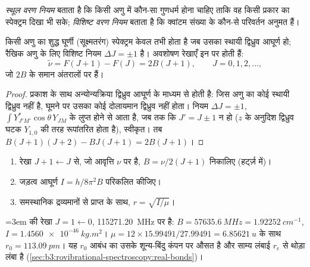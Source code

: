\begin{definition}[स्थूल और विशिष्ट वरण नियम]\label{def:b3:rovibrational-spectroscopy:selection}
\emph{स्थूल वरण नियम} बताता है कि किसी अणु में
कौन-सा गुणधर्म होना चाहिए ताकि वह किसी प्रकार का स्पेक्ट्रम दिखा भी सके;
\emph{विशिष्ट वरण नियम} बताता है कि क्वांटम संख्या के
कौन-से परिवर्तन अनुमत हैं।
\end{definition}

\begin{proposition}[शुद्ध घूर्णी स्पेक्ट्रम]\label{prop:b3:rovibrational-spectroscopy:rotational-lines}
किसी अणु का शुद्ध घूर्णी (सूक्ष्मतरंग) स्पेक्ट्रम केवल तभी होता है जब उसका
स्थायी द्विध्रुव आघूर्ण हो; रैखिक अणु के लिए विशिष्ट नियम $\Delta J
= \pm1$ है। अवशोषण रेखाएँ इन पर होती हैं:
\[
\tilde\nu = F(J+1) - F(J) = 2B(J + 1), \qquad J = 0, 1, 2, \dots,
\]
जो $2B$ के समान अंतरालों पर हैं।
\end{proposition}

\begin{proof}
प्रकाश के साथ अन्योन्यक्रिया द्विध्रुव आघूर्ण के माध्यम से होती है: जिस अणु का कोई
स्थायी द्विध्रुव नहीं है, घूमने पर उसका कोई दोलायमान द्विध्रुव नहीं होता। नियम $\Delta J
= \pm1$, $\int Y_{J'M'}^*\cos\theta\,Y_{JM}$ के लुप्त होने से आता है, जब तक कि $J' = J
\pm 1$ न हो ($z$ के अनुदिश द्विध्रुव घटक $Y_{1,0}$ की तरह रूपांतरित होता है), स्वीकृत।
तब $B(J+1)(J+2) - BJ(J+1) = 2B(J+1)$।
\end{proof}

\begin{method}[घूर्णी रेखा से आबंध लंबाई]\label{met:b3:rovibrational-spectroscopy:bond-length}
\begin{enumerate}
  \item रेखा $J + 1 \leftarrow J$ से, जो आवृत्ति $\nu$ पर है, $B =
        \nu/2(J+1)$ निकालिए (हर्ट्ज़ में)।
  \item जड़त्व आघूर्ण $I = h/8\pi^2B$ परिकलित कीजिए।
  \item समस्थानिक द्रव्यमानों से प्राप्त  के साथ, $r = \sqrt{I/\mu}$।
\end{enumerate}
\end{method}

\begin{example}[कार्बन मोनोऑक्साइड]\label{ex:b3:rovibrational-spectroscopy:co}\emergencystretch=3em
 की रेखा $J = 1 \leftarrow 0$, \qty{115271.20}{MHz} पर है:
$B = \qty{57635.6}{MHz} = \qty{1.92252}{cm^{-1}}$, $I = \qty{1.4560e-46}{kg.m^2}$।
$\mu = 12 \times 15.99491/27.99491 = \qty{6.85621}{u}$ के साथ $r_0 = \qty{113.09}{pm}$।
यह $r_0$ आबंध का उसके शून्य-बिंदु कंपन पर औसत है और साम्य लंबाई $r_e$ से
थोड़ा लंबा है (\cref{sec:b3:rovibrational-spectroscopy:real-bonds})।
\end{example}

